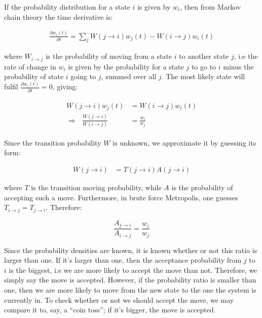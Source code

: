 \documentclass[english, a4paper]{article}
\begin{document}
If the probability distribution for a state $i$ is given by $w_i$, then from Markov chain theory the time derivative is:

\begin{align}
 \frac{\partial w_i(t)}{\partial t} = \sum_j W(j\rightarrow i)w_j(t) - W(i\rightarrow j)w_i(t)
\end{align}

where $W_{i\rightarrow j}$ is the probability of moving from a state $i$ to another state $j$, i.e the rate of change in $w_i$ is given by the probability for a state $j$ to go to $i$ minus the
probability of state $i$ going to $j$, summed over all $j$.
The most likely state will fulfil $\frac{\partial w_i(t)}{\partial t} = 0$, giving:

\begin{align}
\begin{split}
  W(j\rightarrow i)w_j(t) &=  W(i\rightarrow j)w_i(t)\\
 \Rightarrow\:\:\:\frac{  W(j\rightarrow i)}{  W(i\rightarrow j)} &= \frac{w_i}{w_j}
\end{split}
\end{align}

Since the transition probability $W$ is unknown, we approximate it by guessing its form:

\begin{align}
 W(j\rightarrow i) &= T(j\rightarrow i) A(j\rightarrow i)
\end{align}

where $T$ is the transition moving probability, while $A$ is the probability of accepting such a move. Furthermore, in brute force Metropolis, one guesses $T_{i\rightarrow j} = T_{j\rightarrow i}$.
Therefore:

\begin{equation}
 \frac{A_{j\rightarrow i}}{A_{i\rightarrow j}} = \frac{w_i}{w_j}
\end{equation}

Since the probability densities are known, it is known whether or not this ratio is larger than one. If it's larger than one, then the acceptance probability from $j$ to $i$ is the biggest, i.e we are more likely to accept the move than not.
Therefore, we simply say the move is accepted. However, if the probability ratio is smaller than one, then we are more likely to move from the new state to the one the system is currently in.
To check whether or not we should accept the move, we may compare it to, say, a ``coin toss''; if it's bigger, the move is accepted.
\end{document}
